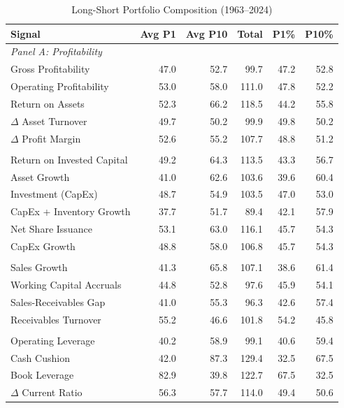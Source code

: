 \begin{table}[htbp]
\centering
\caption{Long-Short Portfolio Composition (1963--2024)}
\label{tab:longshort_composition}
\small
\begin{tabular}{l*{5}{r}}
\toprule
\textbf{Signal} & \textbf{Avg P1} & \textbf{Avg P10} & \textbf{Total} & \textbf{P1\%} & \textbf{P10\%} \\
\midrule
\multicolumn{6}{l}{\textit{Panel A: Profitability}} \\
Gross Profitability & 47.0 & 52.7 & 99.7 & 47.2 & 52.8 \\
Operating Profitability & 53.0 & 58.0 & 111.0 & 47.8 & 52.2 \\
Return on Assets & 52.3 & 66.2 & 118.5 & 44.2 & 55.8 \\
$\Delta$ Asset Turnover & 49.7 & 50.2 & 99.9 & 49.8 & 50.2 \\
$\Delta$ Profit Margin & 52.6 & 55.2 & 107.7 & 48.8 & 51.2 \\
\addlinespace
\multicolumn{6}{l}{\textit{Panel B: Investment}} \\
Return on Invested Capital & 49.2 & 64.3 & 113.5 & 43.3 & 56.7 \\
Asset Growth & 41.0 & 62.6 & 103.6 & 39.6 & 60.4 \\
Investment (CapEx) & 48.7 & 54.9 & 103.5 & 47.0 & 53.0 \\
CapEx + Inventory Growth & 37.7 & 51.7 & 89.4 & 42.1 & 57.9 \\
Net Share Issuance & 53.1 & 63.0 & 116.1 & 45.7 & 54.3 \\
CapEx Growth & 48.8 & 58.0 & 106.8 & 45.7 & 54.3 \\
\addlinespace
\multicolumn{6}{l}{\textit{Panel C: Accruals \& Quality}} \\
Sales Growth & 41.3 & 65.8 & 107.1 & 38.6 & 61.4 \\
Working Capital Accruals & 44.8 & 52.8 & 97.6 & 45.9 & 54.1 \\
Sales-Receivables Gap & 41.0 & 55.3 & 96.3 & 42.6 & 57.4 \\
Receivables Turnover & 55.2 & 46.6 & 101.8 & 54.2 & 45.8 \\
\addlinespace
\multicolumn{6}{l}{\textit{Panel D: Liquidity \& Solvency}} \\
Operating Leverage & 40.2 & 58.9 & 99.1 & 40.6 & 59.4 \\
Cash Cushion & 42.0 & 87.3 & 129.4 & 32.5 & 67.5 \\
Book Leverage & 82.9 & 39.8 & 122.7 & 67.5 & 32.5 \\
$\Delta$ Current Ratio & 56.3 & 57.7 & 114.0 & 49.4 & 50.6 \\

\end{tabular}
\end{table}
